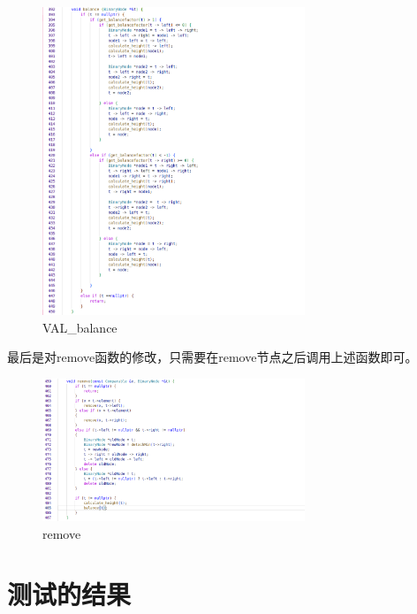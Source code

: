 \documentclass[UTF8]{ctexart}
\begin{document}
	
	\begin{figure}[H] %
		\centering %
		\includegraphics[width=0.7\textwidth]{fig2} %
		\caption{VAL\_balance} %
	\end{figure}
	
	
	
	最后是对remove函数的修改，只需要在remove节点之后调用上述函数即可。
	
	\begin{figure}[H] %
		\centering %
		\includegraphics[width=0.7\textwidth]{fig3} %
		\caption{remove} %
	\end{figure}
	
	\section{测试的结果}
	
\end{document}
